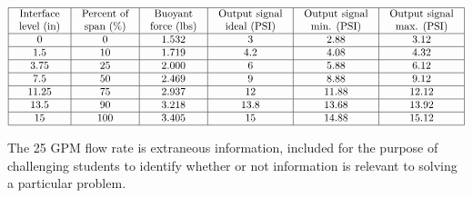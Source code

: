 $$\vbox{\offinterlineskip
\halign{\strut
\vrule \quad\hfil # \ \hfil & 
\vrule \quad\hfil # \ \hfil & 
\vrule \quad\hfil # \ \hfil & 
\vrule \quad\hfil # \ \hfil & 
\vrule \quad\hfil # \ \hfil & 
\vrule \quad\hfil # \ \hfil \vrule \cr
\noalign{\hrule}
%
Interface & Percent of & Buoyant & Output signal & Output signal & Output signal \cr
%
level (in) & span (\%) & force (lbs) & ideal (PSI) & min. (PSI) & max. (PSI) \cr
%
\noalign{\hrule}
%
0 & 0 & 1.532 & 3 & 2.88 & 3.12 \cr
%
\noalign{\hrule}
%
1.5 & 10 & 1.719 & 4.2 & 4.08 & 4.32 \cr
%
\noalign{\hrule}
%
3.75 & 25 & 2.000 & 6 & 5.88 & 6.12 \cr
%
\noalign{\hrule}
%
7.5 & 50 & 2.469 & 9 & 8.88 & 9.12 \cr
%
\noalign{\hrule}
%
11.25 & 75 & 2.937 & 12 & 11.88 & 12.12 \cr
%
\noalign{\hrule}
%
13.5 & 90 & 3.218 & 13.8 & 13.68 & 13.92 \cr
%
\noalign{\hrule}
%
15 & 100 & 3.405 & 15 & 14.88 & 15.12 \cr
%
\noalign{\hrule}
} %
}$$ %

\vskip 10pt

The 25 GPM flow rate is extraneous information, included for the purpose of challenging students to identify whether or not information is relevant to solving a particular problem.




